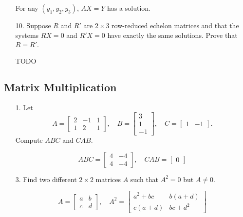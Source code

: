 \documentclass{article}
\begin{document}
\begin{enumerate}[listparindent=\parindent]
For any \((y_1, y_2, y_3)\), \(AX = Y\) has a solution.

\item[10.] Suppose \(R\) and \(R'\) are \(2 \times 3\) row-reduced echelon matrices and that the
    systems \(RX = 0\) and \(R'X = 0\) have exactly the same solutions. Prove that \(R = R'\).

    TODO
\end{enumerate}

\subsection{Matrix Multiplication}

\begin{enumerate}[listparindent=\parindent]
\item[1.] Let
    \[
        A = \begin{bmatrix}
            2 & -1 & 1 \\
            1 & 2 & 1
        \end{bmatrix}, \quad
        B = \begin{bmatrix}
            3 \\ 1 \\ -1
        \end{bmatrix}, \quad
        C = \begin{bmatrix}
            1 & -1
        \end{bmatrix}.
    \]
    Compute \(ABC\) and \(CAB\).

    \[
        ABC = \begin{bmatrix}
            4 & -4 \\
            4 & -4
        \end{bmatrix}
        , \quad
        CAB = \begin{bmatrix}
            0
        \end{bmatrix}
    \]

\item[3.] Find two different \(2 \times 2\) matrices \(A\) such that \(A^2 = 0\) but \(A \neq 0\).

\[
    A = \begin{bmatrix}
        a & b \\
        c & d
    \end{bmatrix}, \quad
    A^2 = \begin{bmatrix}
        a^2 + bc & b(a + d) \\
        c(a + d) & bc + d^2
    \end{bmatrix}
\]


\end{enumerate}
\end{document}
